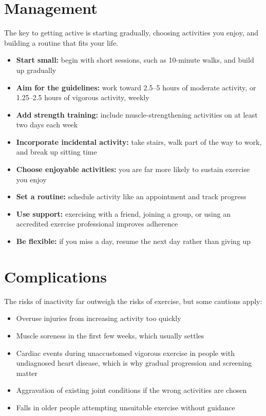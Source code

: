 \section*{Management}
The key to getting active is starting gradually, choosing activities you enjoy, and building a routine that fits your life.

\begin{itemize}
    \item \textbf{Start small:} begin with short sessions, such as 10-minute walks, and build up gradually
    \item \textbf{Aim for the guidelines:} work toward 2.5--5 hours of moderate activity, or 1.25--2.5 hours of vigorous activity, weekly
    \item \textbf{Add strength training:} include muscle-strengthening activities on at least two days each week
    \item \textbf{Incorporate incidental activity:} take stairs, walk part of the way to work, and break up sitting time
    \item \textbf{Choose enjoyable activities:} you are far more likely to sustain exercise you enjoy
    \item \textbf{Set a routine:} schedule activity like an appointment and track progress
    \item \textbf{Use support:} exercising with a friend, joining a group, or using an accredited exercise professional improves adherence
    \item \textbf{Be flexible:} if you miss a day, resume the next day rather than giving up
\end{itemize}

\section*{Complications}
The risks of inactivity far outweigh the risks of exercise, but some cautions apply:

\begin{itemize}
    \item Overuse injuries from increasing activity too quickly
    \item Muscle soreness in the first few weeks, which usually settles
    \item Cardiac events during unaccustomed vigorous exercise in people with undiagnosed heart disease, which is why gradual progression and screening matter
    \item Aggravation of existing joint conditions if the wrong activities are chosen
    \item Falls in older people attempting unsuitable exercise without guidance
\end{itemize}

